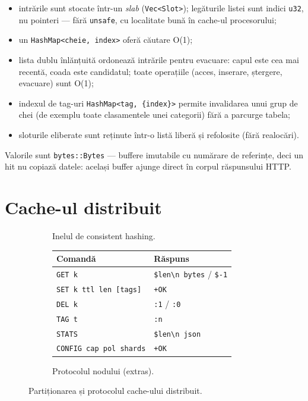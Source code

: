\begin{itemize}
  \item intrările sunt stocate într-un \emph{slab} (\texttt{Vec<Slot>}); legăturile listei sunt indici
        \texttt{u32}, nu pointeri — fără \texttt{unsafe}, cu localitate bună în cache-ul procesorului;
  \item un \texttt{HashMap<cheie, index>} oferă căutare O(1);
  \item lista dublu înlănțuită ordonează intrările pentru evacuare: capul este cea mai recentă, coada este
        candidatul; toate operațiile (acces, inserare, ștergere, evacuare) sunt O(1);
  \item indexul de tag-uri \texttt{HashMap<tag, \{index\}>} permite invalidarea unui grup de chei (de
        exemplu toate clasamentele unei categorii) fără a parcurge tabela;
  \item sloturile eliberate sunt reținute într-o listă liberă și refolosite (fără realocări).
\end{itemize}

Valorile sunt \texttt{bytes::Bytes} — buffere imutabile cu numărare de referințe, deci un hit nu copiază
datele: același buffer ajunge direct în corpul răspunsului HTTP.

\section{Cache-ul distribuit}

\begin{figure}[H]
  \centering
  \begin{subfigure}{0.42\linewidth}\centering
    \resizebox{\linewidth}{!}{}
    \caption{Inelul de consistent hashing.}
    \label{fig:ring}
  \end{subfigure}\hfill
  \begin{subfigure}{0.54\linewidth}\centering\small
    \begin{tabular}{@{}ll@{}}
      \toprule
      Comandă & Răspuns \\
      \midrule
      \texttt{GET k} & \texttt{\$len\textbackslash n bytes} / \texttt{\$-1} \\
      \texttt{SET k ttl len [tags]} & \texttt{+OK} \\
      \texttt{DEL k} & \texttt{:1} / \texttt{:0} \\
      \texttt{TAG t} & \texttt{:n} \\
      \texttt{STATS} & \texttt{\$len\textbackslash n json} \\
      \texttt{CONFIG cap pol shards} & \texttt{+OK} \\
      \bottomrule
    \end{tabular}
    \caption{Protocolul nodului (extras).}
  \end{subfigure}
  \caption{Partiționarea și protocolul cache-ului distribuit.}
\end{figure}

